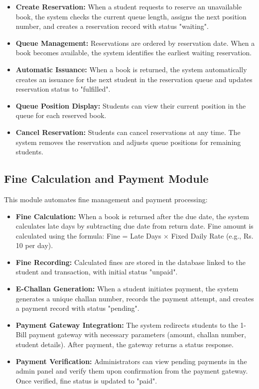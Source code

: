 \documentclass[12pt,a4paper]{report}
\begin{document}
\begin{itemize}
    \item \textbf{Create Reservation:} When a student requests to reserve an unavailable book, the system checks the current queue length, assigns the next position number, and creates a reservation record with status "waiting".
    
    \item \textbf{Queue Management:} Reservations are ordered by reservation date. When a book becomes available, the system identifies the earliest waiting reservation.
    
    \item \textbf{Automatic Issuance:} When a book is returned, the system automatically creates an issuance for the next student in the reservation queue and updates reservation status to "fulfilled".
    
    \item \textbf{Queue Position Display:} Students can view their current position in the queue for each reserved book.
    
    \item \textbf{Cancel Reservation:} Students can cancel reservations at any time. The system removes the reservation and adjusts queue positions for remaining students.
\end{itemize}

\subsection{Fine Calculation and Payment Module}

This module automates fine management and payment processing:

\begin{itemize}
    \item \textbf{Fine Calculation:} When a book is returned after the due date, the system calculates late days by subtracting due date from return date. Fine amount is calculated using the formula: Fine = Late Days × Fixed Daily Rate (e.g., Rs. 10 per day).
    
    \item \textbf{Fine Recording:} Calculated fines are stored in the database linked to the student and transaction, with initial status "unpaid".
    
    \item \textbf{E-Challan Generation:} When a student initiates payment, the system generates a unique challan number, records the payment attempt, and creates a payment record with status "pending".
    
    \item \textbf{Payment Gateway Integration:} The system redirects students to the 1-Bill payment gateway with necessary parameters (amount, challan number, student details). After payment, the gateway returns a status response.
    
    \item \textbf{Payment Verification:} Administrators can view pending payments in the admin panel and verify them upon confirmation from the payment gateway. Once verified, fine status is updated to "paid".
\end{itemize}
\end{document}
